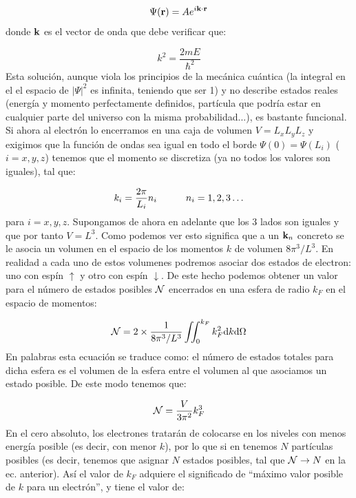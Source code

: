 \begin{equation}
	\Psi (\mathbf{r}) = A e^{i \mathbf{k} \cdot \mathbf{r}}
\end{equation}
donde $\mathbf{k}$ es el vector de onda que debe verificar que:

\begin{equation}
	k^2 = \frac{2mE}{\hbar^2}
\end{equation}
Esta solución, aunque viola los principios de la mecánica cuántica (la integral en el el espacio de $|\Psi|^2$ es infinita, teniendo que ser 1) y no describe estados reales (energía y momento perfectamente definidos, partícula que podría estar en cualquier parte del universo con la misma probabilidad...), es bastante funcional. Si ahora al electrón lo encerramos en una caja de volumen $V=L_xL_yL_z$ y exigimos que la función de ondas sea igual en todo el borde $\Psi (0)=\Psi(L_i)$ ($i=x,y,z$) tenemos que el momento se discretiza (ya no todos los valores son iguales), tal que:

\begin{equation}
	k_i = \frac{2\pi}{L_i} n_i \quad \quad \quad n_i = 1,2,3\ldots
\end{equation}
para $i=x,y,z$. Supongamos de ahora en adelante que los 3 lados son iguales y que por tanto $V=L^3$. Como podemos ver esto significa que a un $\mathbf{k}_n$ concreto se le asocia un volumen en el espacio de los momentos $k$ de volumen $8\pi^3 /L^3$. En realidad a cada uno de estos volumenes podremos asociar dos estados de electron: uno con espín $\uparrow$ y otro con espín $\downarrow$. De este hecho podemos obtener un valor para el número de estados posibles $\mathcal{N}$ encerrados en una esfera de radio $k_F$ en el espacio de momentos:

\begin{equation}
	\mathcal{N} = 2 \times \frac{1}{8\pi^3/L^3} \iint_0^{k_F} k_F^2 \mathrm{d} k \mathrm{d} \Omega
\end{equation}
En palabras esta ecuación se traduce como: el número de estados totales para dicha esfera es el volumen de la esfera entre el volumen al que asociamos un estado posible. De este modo tenemos que:

\begin{equation}
	\mathcal{N} = \frac{V}{3\pi^2} k_F^3
\end{equation}
En el cero absoluto, los electrones tratarán de colocarse en los niveles con menos energía posible (es decir, con menor $k$), por lo que si en tenemos $N$ partículas posibles (es decir, tenemos que asignar $N$ estados posibles, tal que $\mathcal{N} \rightarrow N$ en la ec. anterior). Así el valor de $k_F$ adquiere el significado de ``máximo valor posible de $k$ para un electrón'', y tiene el valor de:

